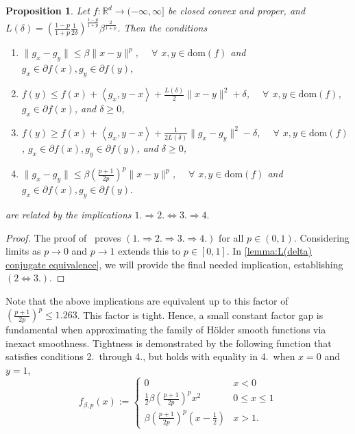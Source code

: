\documentclass[11pt, hidelinks]{article}
\numberwithin{equation}{section}
\newcommand{\dom}[1]{\mathrm{dom }(#1)}
\newcommand{\Rext}{(-\infty, \infty]}
\theoremstyle{thmstyletwo}%
\newtheorem{proposition}[thm]{Proposition}
\numberwithin{equation}{section}
\newcommand{\R}{\mathbb{R}}
\newcommand{\Holder}{H\"older }
\newcommand{\inner}[2]{\left\langle {#1}, {#2} \right\rangle}
\begin{document}
\begin{proposition}\label{prop:Equiv Char of HS functions}
    Let $f : \R^d \to \Rext$ be closed convex and proper, and $L(\delta) = \left(\frac{1-p}{1+p}\frac{1}{2\delta}\right)^\frac{1-p}{1+p} \beta^{\frac{2}{1+p}}$. Then the conditions
    \begin{enumerate}
        \item $\|g_x-g_y\| \leq \beta \|x-y\|^p$, $\quad \forall$ $x, y \in \dom{f}$ and $g_x \in \partial f(x),  g_y \in \partial f(y) $,
      \item $f(y) \leq f(x) + \inner{g_x}{y-x}+\frac{L(\delta)}{2}\|x-y\|^{2}+\delta$, $\quad \forall$ $x, y \in \dom{f}$, $g_x \in \partial f(x)$, and $\delta \geq 0$,
        \item $f(y) \geq f(x) + \inner{g_x}{y-x}+\frac{1}{2L(\delta)}\|g_x-g_y\|^{2} - \delta$, $\quad \forall$ $x, y \in \dom{f}$, $g_x \in \partial f(x),  g_y \in \partial f(y) $, and $\delta \geq 0$,
        \item $\|g_x-g_y\| \leq \beta \left(\frac{p+1}{2p}\right)^p\|x-y\|^p$, $\quad \forall$ $x, y \in \dom{f}$ and $g_x \in \partial f(x),  g_y \in \partial f(y) .$
    \end{enumerate}
    are related by the implications $1. \Longrightarrow 2. \Longleftrightarrow 3. \Longrightarrow 4.$
\end{proposition}
\begin{proof}
    The proof of~\cite[Lemma 1]{li2024simpleuniformlyoptimalmethod} proves $(1. \Longrightarrow 2. \Longrightarrow 3. \Longrightarrow 4.)$ for all $p \in (0,1)$. Considering limits as $p \to 0$ and $p \to 1$ extends this to $p\in [0,1]$. In \cref{lemma:L(delta) conjugate equivalence}, we will provide the final needed implication, establishing $(2 \Longleftrightarrow 3.)$.
 \end{proof}


Note that the above implications are equivalent up to this factor of $\left(\frac{p+1}{2p}\right)^p \leq 1.263$. This factor is tight. Hence, a small constant factor gap is fundamental when approximating the family of \Holder smooth functions via inexact smoothness. Tightness is demonstrated by the following function that satisfies conditions 2.~through 4., but holds with equality in 4.~when $x=0$ and $y=1$,
\begin{equation}\label{ex:tightness-Holder-condition}f_{\beta, p}(x) := \begin{cases}
    0 & x < 0\\
    \frac{1}{2}\beta\left(\frac{p+1}{2p}\right)^{p}x^2 & 0 \leq x \leq 1\\
    \beta\left(\frac{p+1}{2p}\right)^{p}\left(x-\frac{1}{2}\right) & x > 1.
\end{cases}\end{equation}
\end{document}
